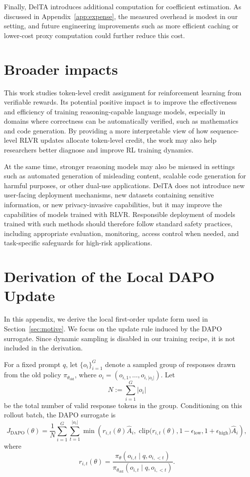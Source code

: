 \documentclass{llmxive}
\begin{document}
Finally, DelTA introduces additional computation for coefficient estimation. 
As discussed in Appendix~\ref{app:expense}, the measured overhead is modest in our setting, and future engineering improvements such as more efficient caching or lower-cost proxy computation could further reduce this cost.

\section{Broader impacts}
This work studies token-level credit assignment for reinforcement learning from verifiable rewards. 
Its potential positive impact is to improve the effectiveness and efficiency of training reasoning-capable language models, especially in domains where correctness can be automatically verified, such as mathematics and code generation. 
By providing a more interpretable view of how sequence-level RLVR updates allocate token-level credit, the work may also help researchers better diagnose and improve RL training dynamics.

At the same time, stronger reasoning models may also be misused in settings such as automated generation of misleading content, scalable code generation for harmful purposes, or other dual-use applications. 
DelTA does not introduce new user-facing deployment mechanisms, new datasets containing sensitive information, or new privacy-invasive capabilities, but it may improve the capabilities of models trained with RLVR. 
Responsible deployment of models trained with such methods should therefore follow standard safety practices, including appropriate evaluation, monitoring, access control when needed, and task-specific safeguards for high-risk applications.

\section{Derivation of the Local DAPO Update}
\label{app:dapo-local-update}

In this appendix, we derive the local first-order update form used in
Section~\ref{sec:motive}. We focus on the update rule induced by the DAPO
surrogate. Since dynamic sampling is disabled in our training recipe, it is not
included in the derivation.

For a fixed prompt \(q\), let \(\{o_i\}_{i=1}^G\) denote a sampled group of
responses drawn from the old policy \(\pi_{\theta_{\mathrm{old}}}\), where
\(o_i=(o_{i,1},\dots,o_{i,|o_i|})\). Let
\[
N := \sum_{i=1}^G |o_i|
\]
be the total number of valid response tokens in the group. Conditioning on this
rollout batch, the DAPO surrogate is
\[
J_{\mathrm{DAPO}}(\theta)
=
\frac{1}{N}
\sum_{i=1}^G \sum_{t=1}^{|o_i|}
\min\!\left(
r_{i,t}(\theta)\hat A_i,\;
\mathrm{clip}\!\big(
r_{i,t}(\theta),
1-\epsilon_{\mathrm{low}},
1+\epsilon_{\mathrm{high}}
\big)\hat A_i
\right),
\]
where
\[
r_{i,t}(\theta)
=
\frac{
\pi_\theta(o_{i,t}\mid q,o_{i,<t})
}{
\pi_{\theta_{\mathrm{old}}}(o_{i,t}\mid q,o_{i,<t})
}.
\]
\end{document}

